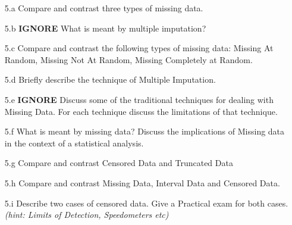 \documentclass[a4paper,12pt]{article}
\begin{document}
\begin{itemize}
\item[5.a] Compare and contrast three types of missing data.
\item[5.b] \textbf{IGNORE} What is meant by multiple imputation?
\item[5.c] Compare and contrast the following types of missing data: Missing At Random, Missing
Not At Random, Missing Completely at Random.
\item[5.d]Briefly describe the technique of Multiple Imputation.
\item[5.e] \textbf{IGNORE} Discuss some of the traditional techniques for dealing with Missing Data. For each technique discuss the limitations of that technique.
\item[5.f] What is meant by missing data? Discuss the implications of Missing data in the context of a statistical analysis.
\item[5.g] Compare and contrast Censored Data and Truncated Data
\item[5.h] Compare and contrast Missing Data, Interval Data and Censored Data.
\item[5.i] Describe two cases of censored data. Give a Practical exam for both cases. \textit{(hint: Limits of Detection, Speedometers etc)}
\end{itemize}
\end{document}
